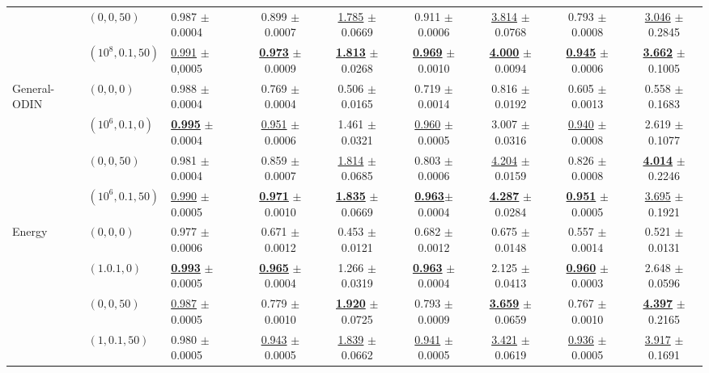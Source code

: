 \begin{table}[htb]
\begin{adjustbox}{width=1\textwidth,center}
\begin{tabular}{l|l|l|c|c|c|c|c|c}
			& $(0, 0, 50)$ & 0.987 $\pm$ 0.0004 & 0.899 $\pm$ 0.0007 & \underline{1.785} $\pm$ 0.0669 & 0.911 $\pm$ 0.0006 & \underline{3.814} $\pm$ 0.0768 & 0.793 $\pm$ 0.0008 & \underline{3.046} $\pm$ 0.2845\\
			& $(10^8, 0.1, 50)$ & \underline{0.991} $\pm$ 0,0005 & \underline{\textbf{0.973}} $\pm$ 0.0009 & \underline{\textbf{1.813}} $\pm$ 0.0268 & \underline{\textbf{0.969}} $\pm$ 0.0010 & \underline{\textbf{4.000}} $\pm$ 0.0094 & \underline{\textbf{0.945}} $\pm$ 0.0006 & \underline{\textbf{3.662}} $\pm$ 0.1005\\ \hline
            \multirow{4}{0.10\linewidth}{General-ODIN} 
			& $(0, 0, 0)$ & 0.988 $\pm$ 0.0004 & 0.769 $\pm$ 0.0004 & 0.506 $\pm$ 0.0165 & 0.719 $\pm$ 0.0014 & 0.816 $\pm$ 0.0192 & 0.605 $\pm$ 0.0013 & 0.558 $\pm$ 0.1683\\
			& $(10^6, 0.1, 0)$ & \underline{\textbf{0.995}} $\pm$ 0.0004 & \underline{0.951} $\pm$ 0.0006 & 1.461 $\pm$ 0.0321 & \underline{0.960} $\pm$ 0.0005 & 3.007 $\pm$ 0.0316 & \underline{0.940} $\pm$ 0.0008 & 2.619 $\pm$ 0.1077\\
			& $(0, 0, 50)$ & 0.981 $\pm$ 0.0004 & 0.859 $\pm$ 0.0007 & \underline{1.814} $\pm$ 0.0685 & 0.803 $\pm$ 0.0006 & \underline{4.204} $\pm$ 0.0159 & 0.826 $\pm$ 0.0008 & \underline{\textbf{4.014}} $\pm$ 0.2246\\
			& $(10^6, 0.1, 50)$ & \underline{0.990} $\pm$ 0.0005 & \underline{\textbf{0.971}} $\pm$ 0.0010 & \underline{\textbf{1.835}} $\pm$ 0.0669 & \underline{\textbf{0.963}}$\pm$ 0.0004 & \underline{\textbf{4.287}} $\pm$ 0.0284 & \underline{\textbf{0.951}} $\pm$ 0.0005 & \underline{3.695} $\pm$ 0.1921 \\ \hline
            \multirow{4}{0.10\linewidth}{Energy} 
			& $(0, 0, 0)$ & 0.977 $\pm$ 0.0006 & 0.671 $\pm$ 0.0012 & 0.453 $\pm$ 0.0121 & 0.682 $\pm$ 0.0012 & 0.675 $\pm$ 0.0148 & 0.557 $\pm$ 0.0014 & 0.521 $\pm$ 0.0131\\
			& $(1. 0.1, 0)$ & \underline{\textbf{0.993}} $\pm$ 0.0005 & \underline{\textbf{0.965}} $\pm$ 0.0004 & 1.266 $\pm$ 0.0319 & \underline{\textbf{0.963}} $\pm$ 0.0004 & 2.125 $\pm$ 0.0413 & \underline{\textbf{0.960}} $\pm$ 0.0003 & 2.648 $\pm$ 0.0596\\
			& $(0, 0, 50)$ & \underline{0.987} $\pm$ 0.0005 & 0.779 $\pm$ 0.0010 & \underline{\textbf{1.920}} $\pm$ 0.0725 & 0.793 $\pm$ 0.0009 & \underline{\textbf{3.659}} $\pm$ 0.0659 & 0.767 $\pm$ 0.0010 & \underline{\textbf{4.397}} $\pm$ 0.2165 \\
			& $(1, 0.1, 50)$ & 0.980 $\pm$ 0.0005 & \underline{0.943} $\pm$ 0.0005 & \underline{1.839} $\pm$ 0.0662 & \underline{0.941} $\pm$ 0.0005 & \underline{3.421} $\pm$ 0.0619 & \underline{0.936} $\pm$ 0.0005 & \underline{3.917} $\pm$ 0.1691 \\ \hline

\end{tabular}
\end{adjustbox}
\end{table}
